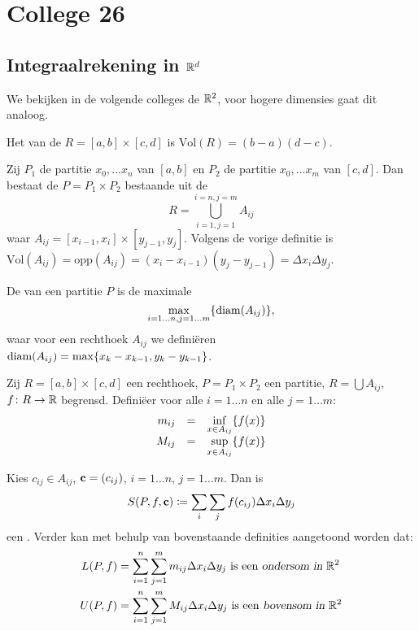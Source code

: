 \documentclass{2wa40summary}
\newcommand\ds{\displaystyle}
\def\diam{\text{diam}}
\begin{document}
		\newpage
		\section{College 26}
		\subsection{Integraalrekening in $\mathbb{R}^d$}
			We bekijken in de volgende colleges de $\reals^2$, voor hogere dimensies gaat dit analoog.
			\begin{define}
				Het  van de  $R =[a,b]\times[c,d]$ is  $\text{Vol}(R) = (b-a)(d-c)$.
			\end{define}
\begin{theorem}
Zij $P_1$ de partitie $x_0,\ldots x_n$ van $[a,b]$ en
$P_2$ de partitie $x_0,\ldots x_m$ van $[c,d]$.
Dan bestaat de  $P=P_1 \times P_2$ bestaande uit de 
\[
R = \bigcup_{i=1,j=1}^{i=n,j=m} A_{ij}
\]
waar $A_{ij}=[x_{i-1},x_i] \times [y_{j-1},y_j]$.
Volgens de vorige definitie is $\text{Vol}(A_{ij})=\text{opp}(A_{ij})=(x_i-x_{i-1})(y_j-y_{j-1}) = \Delta x_i \Delta y_j$.
\end{theorem}
			\begin{define}
				De  van een partitie $P$ is de maximale \indx{diameter}
\[
\max_{i=1\ldots n,j=1\ldots m}\set{\diam(A_{ij})},
\]
waar voor een rechthoek $A_{ij}$ we defini\"eren $\diam(A_{ij}) = \max\set{x_k-x_{k-1},y_k-y_{k-1}}$. %

			\end{define}
			\begin{define}
				Zij $R=[a,b]\times[c,d]$ een rechthoek, $P=P_1 \times P_2$ een partitie, $R=\bigcup A_{ij}$, $f\colon R \to \mathbb{R}$ begrensd.
				Defini\"eer voor alle $i=1 \ldots n$ en alle $j=1 \ldots m$:
				\[
					\begin{array}{rcl}
						m_{ij} &=& \ds\inf_{x \in A_{ij}}\set{f(x)}\\
						M_{ij} &=& \ds\sup_{x \in A_{ij}}\set{f(x)}
					\end{array}
				\]
			\end{define}
			\begin{define}
				Kies $c_{ij} \in A_{ij}$, ${\textbf{c}}=(c_{ij})$, $i=1 \ldots n$, $j=1 \ldots m$. Dan is
				\[ 
					S(P,f,{\textbf{c}}) \coloneqq  \sum_i \sum_j f(c_{ij}) \Delta x_i \Delta y_j
				 \]
				 een \indx{Riemannsom in $\reals^2$}.
Verder kan met behulp van bovenstaande definities aangetoond worden dat:
				\begin{align*}
					L(P,f) &= \sum_{i=1}^{n} \sum_{j=1}^{m} m_{ij} \Delta x_i \Delta y_j \text{ is een \indx{ondersom in $\reals^2$}} \\
					U(P,f) &= \sum_{i=1}^{n} \sum_{j=1}^{m} M_{ij} \Delta x_i \Delta y_j \text{ is een \indx{bovensom in $\reals^2$}}
				 \end{align*}
				 
			\end{define}
\end{document}
